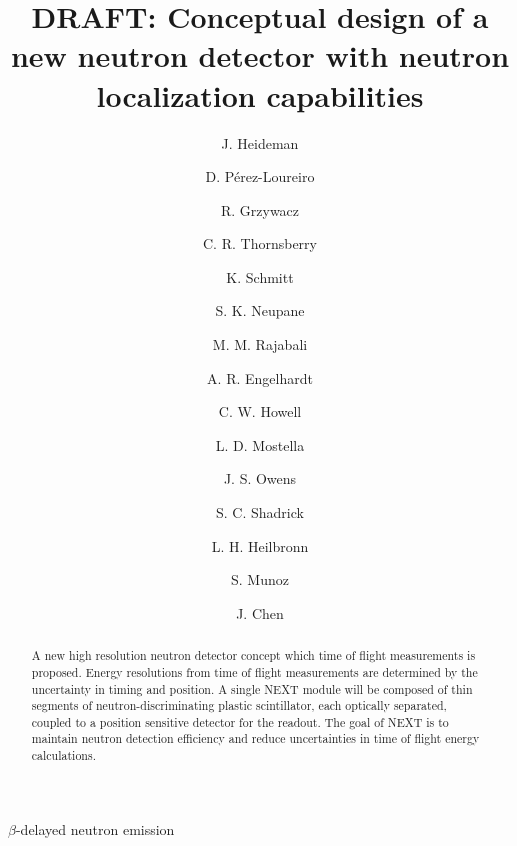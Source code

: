\documentclass[preprint,3p,twocolumn]{elsarticle}
\begin{document}
\begin{frontmatter}

\title{DRAFT: Conceptual design of a new neutron detector with neutron localization capabilities}


\author[mymainaddress]{J. Heideman}
\author[mymainaddress]{D. P\'erez-Loureiro}

\author[mymainaddress,ORNLaddress]{R. Grzywacz}
\author[mymainaddress]{C. R. Thornsberry}

\author[mymainaddress]{K. Schmitt}
\author[mymainaddress]{S. K. Neupane}

\author[TTUaddress]{M. M. Rajabali}
\author[TTUaddress]{A. R. Engelhardt}
\author[TTUaddress]{C. W. Howell}
\author[TTUaddress]{L. D. Mostella}
\author[TTUaddress]{J. S. Owens}
\author[TTUaddress]{S. C. Shadrick}
\author[UTKNEaddress]{L. H. Heilbronn}
\author[JINPAaddress]{S. Munoz}


\author[mymainaddress]{J. Chen}



\address[mymainaddress]{Department of Physics and Astronomy,  University of Tennessee, Knoxville, Tennessee , 37996 USA}
\address[UTKNEaddress]{Department of Nuclear Engineering,  University of Tennessee, Knoxville, Tennessee , 37996 USA}
\address[ORNLaddress]{Physics Division, Oak Ridge National Laboratory, Oak Ridge TN 37831 USA}
\address[TTUaddress]{Department of Physics Tennessee Technological University, Cookeville, Tennessee, 38505, USA}
\address[JINPAaddress]{Joint Institute for Nuclear Physics and Applications, Oak Ridge TN 37831 USA}


\begin{abstract}
A new high resolution neutron detector concept which time of flight measurements is proposed. Energy resolutions from time of flight measurements are determined by the uncertainty in timing and position. A single NEXT module will be composed of thin segments of neutron-discriminating plastic scintillator, each optically separated, coupled to a position sensitive detector for the readout. The goal of NEXT is to maintain neutron detection efficiency and reduce uncertainties in time of flight energy calculations.
\end{abstract}

\begin{keyword}
$\beta$-delayed neutron emission
\end{keyword}

\end{frontmatter}
\end{document}
